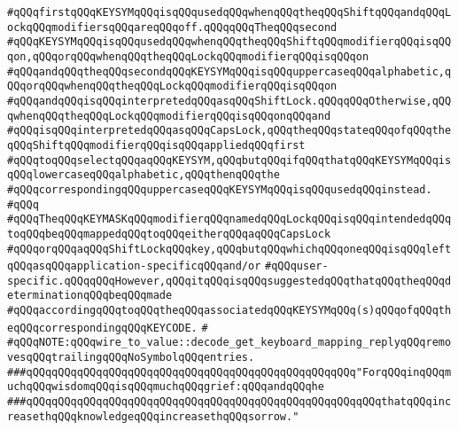 \verb|#qQQqfirstqQQqKEYSYMqQQqisqQQqusedqQQqwhenqQQqtheqQQqShiftqQQqandqQQqLockqQQqmodifiersqQQqareqQQqoff.qQQqqQQqTheqQQqsecond|\newline
\verb|#qQQqKEYSYMqQQqisqQQqusedqQQqwhenqQQqtheqQQqShiftqQQqmodifierqQQqisqQQqon,qQQqorqQQqwhenqQQqtheqQQqLockqQQqmodifierqQQqisqQQqon|\newline
\verb|#qQQqandqQQqtheqQQqsecondqQQqKEYSYMqQQqisqQQquppercaseqQQqalphabetic,qQQqorqQQqwhenqQQqtheqQQqLockqQQqmodifierqQQqisqQQqon|\newline
\verb|#qQQqandqQQqisqQQqinterpretedqQQqasqQQqShiftLock.qQQqqQQqOtherwise,qQQqwhenqQQqtheqQQqLockqQQqmodifierqQQqisqQQqonqQQqand|\newline
\verb|#qQQqisqQQqinterpretedqQQqasqQQqCapsLock,qQQqtheqQQqstateqQQqofqQQqtheqQQqShiftqQQqmodifierqQQqisqQQqappliedqQQqfirst|\newline
\verb|#qQQqtoqQQqselectqQQqaqQQqKEYSYM,qQQqbutqQQqifqQQqthatqQQqKEYSYMqQQqisqQQqlowercaseqQQqalphabetic,qQQqthenqQQqthe|\newline
\verb|#qQQqcorrespondingqQQquppercaseqQQqKEYSYMqQQqisqQQqusedqQQqinstead.|\newline
\verb|#qQQq|\newline
\verb|#qQQqTheqQQqKEYMASKqQQqmodifierqQQqnamedqQQqLockqQQqisqQQqintendedqQQqtoqQQqbeqQQqmappedqQQqtoqQQqeitherqQQqaqQQqCapsLock|\newline
\verb|#qQQqorqQQqaqQQqShiftLockqQQqkey,qQQqbutqQQqwhichqQQqoneqQQqisqQQqleftqQQqasqQQqapplication-specificqQQqand/or|\newline
\verb|#qQQquser-specific.qQQqqQQqHowever,qQQqitqQQqisqQQqsuggestedqQQqthatqQQqtheqQQqdeterminationqQQqbeqQQqmade|\newline
\verb|#qQQqaccordingqQQqtoqQQqtheqQQqassociatedqQQqKEYSYMqQQq(s)qQQqofqQQqtheqQQqcorrespondingqQQqKEYCODE.|\newline
\verb|#|\newline
\verb|#qQQqNOTE:qQQqwire_to_value::decode_get_keyboard_mapping_replyqQQqremovesqQQqtrailingqQQqNoSymbolqQQqentries.|\newline
\newline
\newline
\newline
\verb|###qQQqqQQqqQQqqQQqqQQqqQQqqQQqqQQqqQQqqQQqqQQqqQQqqQQq"ForqQQqinqQQqmuchqQQqwisdomqQQqisqQQqmuchqQQqgrief:qQQqandqQQqhe|\newline
\verb|###qQQqqQQqqQQqqQQqqQQqqQQqqQQqqQQqqQQqqQQqqQQqqQQqqQQqqQQqthatqQQqincreasethqQQqknowledgeqQQqincreasethqQQqsorrow."|\newline
